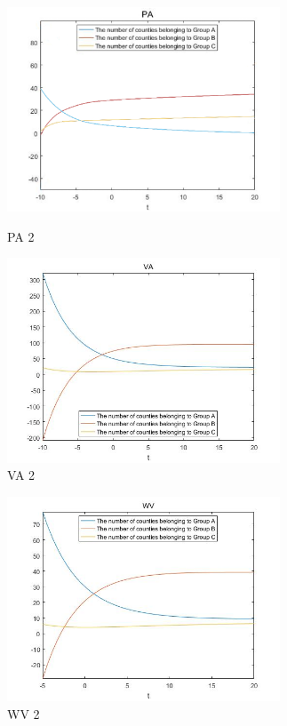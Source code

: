 \documentclass{mcmthesis}
\begin{document}
\begin{figure}[H]
\centering
\begin{minipage}[t]{0.45\textwidth}
\centering
\includegraphics[width=3.2in]{figures/picture/PA_2.jpg}
\caption{PA 2}
\label{PA 2}
\end{minipage}
\hfill
\begin{minipage}[t]{0.45\textwidth}
\centering
\includegraphics[width=3.2in]{figures/picture/VA_2.jpg}
\caption{VA 2}
\label{VA 2}
\end{minipage}
\end{figure}

\begin{figure}[H]
\centering
\begin{minipage}[t]{0.45\textwidth}
\centering
\includegraphics[width=3.2in]{figures/picture/WV_2.jpg}
\caption{WV 2}
\label{WV 2}
\end{minipage}
\hfill
\begin{minipage}[t]{0.45\textwidth}
\end{minipage}
\end{figure}
\end{document}
